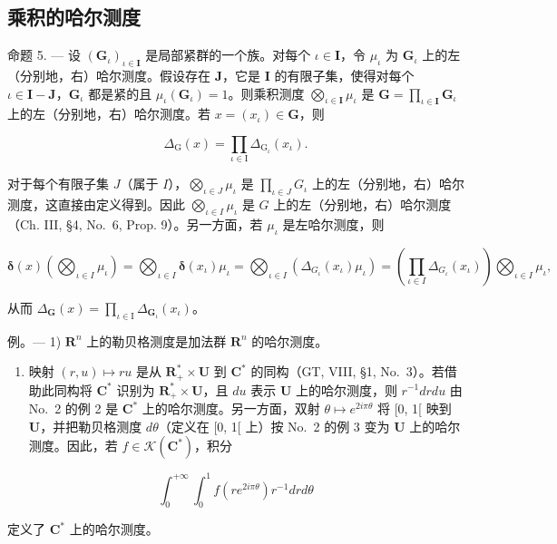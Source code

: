 \subsection{乘积的哈尔测度}

命题 5. --- 设 \((\mathbf{G}_{\iota})_{\iota \in \mathbf{I}}\) 是局部紧群的一个族。对每个 \(\iota \in \mathbf{I}\)，令 \(\mu_{\iota}\) 为 \(\mathbf{G}_{\iota}\) 上的左（分别地，右）哈尔测度。假设存在 \(\mathbf{J}\)，它是 \(\mathbf{I}\) 的有限子集，使得对每个 \(\iota \in \mathbf{I} - \mathbf{J}\)，\(\mathbf{G}_{\iota}\) 都是紧的且 \(\mu_{\iota}(\mathbf{G}_{\iota}) = 1\)。则乘积测度 \(\bigotimes_{\iota \in \mathbf{I}} \mu_{\iota}\) 是 \(\mathbf{G} = \prod_{\iota \in \mathbf{I}} \mathbf{G}_{\iota}\) 上的左（分别地，右）哈尔测度。若 \(x = (x_{\iota}) \in \mathbf{G}\)，则

\[
\Delta_ {\mathrm{G}} (x) = \prod_ {\iota \in \mathrm{I}} \Delta_ {\mathrm{G} _ {\iota}} (x _ {\iota}).
\]

对于每个有限子集 \(J\)（属于 \(I\)），\(\bigotimes_{\iota \in J} \mu_{\iota}\) 是 \(\prod_{\iota \in J} G_{\iota}\) 上的左（分别地，右）哈尔测度，这直接由定义得到。因此 \(\bigotimes_{\iota \in I} \mu_{\iota}\) 是 \(G\) 上的左（分别地，右）哈尔测度（Ch. III, §4, No.~6, Prop. 9）。另一方面，若 \(\mu_{\iota}\) 是左哈尔测度，则

\[
\boldsymbol {\delta} (x) \left(\bigotimes_ {\iota \in I} \mu_ {\iota}\right) = \bigotimes_ {\iota \in I} \boldsymbol {\delta} \left(x _ {\iota}\right) \mu_ {\iota} = \bigotimes_ {\iota \in I} \left(\Delta_ {G _ {\iota}} \left(x _ {\iota}\right) \mu_ {\iota}\right) = \left(\prod_ {\iota \in I} \Delta_ {G _ {\iota}} \left(x _ {\iota}\right)\right) \bigotimes_ {\iota \in I} \mu_ {\iota},
\]

从而 \(\Delta_{\mathbf{G}}(x) = \prod_{\iota \in \mathrm{I}}\Delta_{\mathbf{G}_{\iota}}(x_{\iota})\)。

例。--- 1) \(\mathbf{R}^n\) 上的勒贝格测度是加法群 \(\mathbf{R}^n\) 的哈尔测度。

\begin{enumerate}
\def\labelenumi{\arabic{enumi})}
\setcounter{enumi}{1}
\tightlist
\item
  映射 \((r, u) \mapsto ru\) 是从 \(\mathbf{R}_+^* \times \mathbf{U}\) 到 \(\mathbf{C}^*\) 的同构（GT, VIII, §1, No.~3）。若借助此同构将 \(\mathbf{C}^*\) 识别为 \(\mathbf{R}_+^* \times \mathbf{U}\)，且 \(du\) 表示 \(\mathbf{U}\) 上的哈尔测度，则 \(r^{-1} dr du\) 由 No.~2 的例 2 是 \(\mathbf{C}^*\) 上的哈尔测度。另一方面，双射 \(\theta \mapsto e^{2i\pi\theta}\) 将 {[}0, 1{[} 映到 \(\mathbf{U}\)，并把勒贝格测度 \(d\theta\)（定义在 {[}0, 1{[} 上）按 No.~2 的例 3 变为 \(\mathbf{U}\) 上的哈尔测度。因此，若 \(f \in \mathcal{K}(\mathbf{C}^*)\)，积分
\end{enumerate}

\[
\int_ {0} ^ {+ \infty} \int_ {0} ^ {1} f (r e ^ {2 i \pi \theta}) r ^ {- 1} d r d \theta
\]

定义了 \(\mathbf{C}^*\) 上的哈尔测度。


